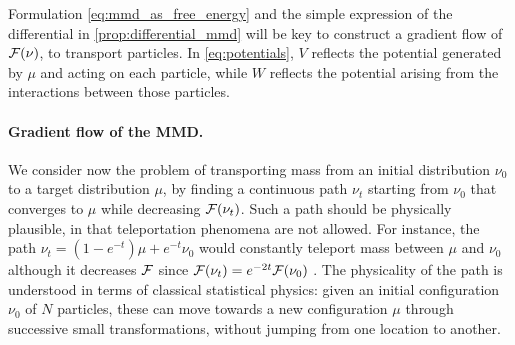 Formulation \cref{eq:mmd_as_free_energy} and the simple expression of the differential in \cref{prop:differential_mmd} will be key to construct a gradient flow of ${{\mathcal F}}(\nu)$, to transport particles. In \cref{eq:potentials}, $V$ reflects the potential generated by $\mu$ and acting on each particle, while $W$ reflects the potential arising from the interactions between those particles.  %
\paragraph{Gradient flow of the MMD.}\label{paragraph:flow_MMD}
We consider now the problem of transporting mass from an initial distribution $\nu_0$ to a target distribution $\mu$, by finding a continuous path $\nu_t$ starting from $\nu_0$ that  converges to $\mu$ while decreasing ${{\mathcal F}}(\nu_t)$. Such a path should be physically plausible, in that  teleportation phenomena are not allowed. For instance, the path $\nu_t = (1-e^{-t})\mu + e^{-t}\nu_0$ would constantly teleport mass between $\mu$ and $\nu_0$ although it decreases  ${{\mathcal F}}$ since ${{\mathcal F}}(\nu_t)=e^{-2t}{{\mathcal F}}(\nu_0)$
\cite[Section 3.1, Case 1]{Mroueh:2019}.
The physicality of the path is understood in terms of classical statistical physics: given an initial configuration $\nu_0$ of $N$ particles, these can move towards a new configuration $\mu$ through successive small transformations, without jumping from one location to another. %

